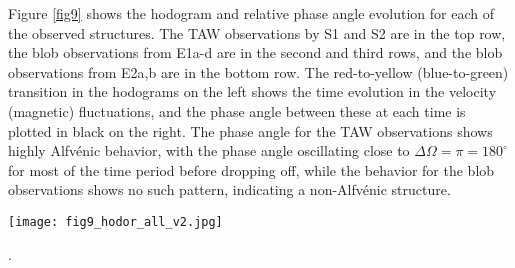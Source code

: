 \documentclass[preprint]{aastex62}
\begin{document}
Figure \ref{fig9} shows the hodogram and relative phase angle evolution for each of the observed structures. The TAW observations by S1 and S2 are in the top row, the blob observations from E1a-d are in the second and third rows, and the blob observations from E2a,b are in the bottom row. The red-to-yellow (blue-to-green) transition in the hodograms on the left shows the time evolution in the velocity (magnetic) fluctuations, and the phase angle between these at each time is plotted in black on the right. The phase angle for the TAW observations shows highly Alfv\'{e}nic behavior, with the phase angle oscillating close to $\Delta \Omega = \pi = 180^{\circ}$ for most of the time period before dropping off, while the behavior for the blob observations shows no such pattern, indicating a non-Alfv\'{e}nic structure. 


\begin{figure*}
	\centerline{ \texttt{[image: fig9\_hodor\_all\_v2.jpg]} }
	\caption{Hodograms and phase angle evolution of the perpendicular components of the magnetic field $\delta \boldsymbol{B_\perp}$ and normalized velocity fluctuations $(4\pi\rho)^{1/2} \delta \boldsymbol{ V_\perp }$ in our TAW samples S1, S2 (top row), and each of the equatorial streamer blob events, E1a-d (second and third rows) and E2a,b (forth row). The colors in each hodogram show the temporal evolution of the magnetic fluctuations (blue-to-green) and the velocity fluctuations red-to-yellow over the duration of the events. The relative phase difference $\Delta \Omega$ between the $\delta \boldsymbol{ B_{\perp}}$ and $\delta \boldsymbol{ V_{\perp} }$ components are plotted next to each hodogram (also summarized in Table \ref{tab:dhdt})}.
	\label{fig9}
\end{figure*}

 

%
%
\end{document}
